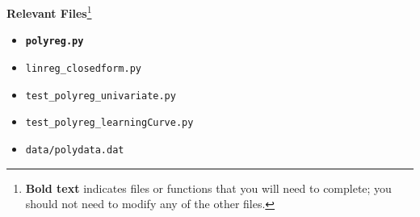 {\bf Relevant Files}\footnote{{\bf Bold text} indicates files or functions that you will need to complete; you should not need to modify any of the other files.}
\vspace{-1.2em}
\begin{multicols}{2}
\begin{itemize}[noitemsep,nolistsep]
\item \texttt{\bf polyreg.py}
\item \texttt{linreg\_closedform.py}
\item \texttt{test\_polyreg\_univariate.py}
\item \texttt{test\_polyreg\_learningCurve.py}
\item \texttt{data/polydata.dat}
\end{itemize}
\end{multicols}
